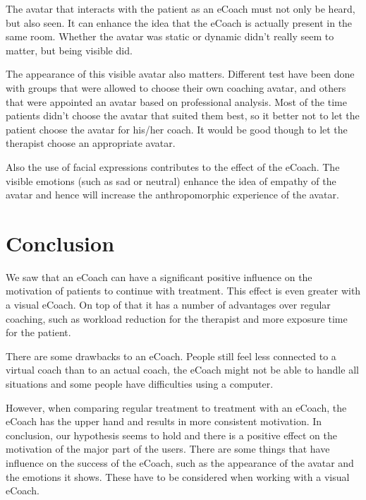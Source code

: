 \documentclass[twoside]{article}
\begin{document}
\begin{multicols}{2}
The avatar that interacts with the patient as an eCoach must not only be heard, but also seen. It can enhance the idea that the eCoach is actually present in the same room. Whether the avatar was static or dynamic didn't really seem to matter, but being visible did.\cite{baylor2009promoting}

The appearance of this visible avatar also matters. Different test have been done with groups that were allowed to choose their own coaching avatar, and others that were appointed an avatar based on professional analysis. Most of the time patients didn't choose the avatar that suited them best, so it better not to let the patient choose the avatar for his/her coach. It would be good though to let the therapist choose an appropriate avatar.\cite{baylor2009promoting}

Also the use of facial expressions contributes to the effect of the eCoach. The visible emotions (such as sad or neutral) enhance the idea of empathy of the avatar \cite{blanson2009online} and hence will increase the anthropomorphic experience of the avatar.


\section{Conclusion}
We saw that an eCoach can have a significant positive influence on the motivation of patients to continue with treatment. This effect is even greater with a visual eCoach. On top of that it has a number of advantages over regular coaching, such as workload reduction for the therapist and more exposure time for the patient.

There are some drawbacks to an eCoach. People still feel less connected to a virtual coach than to an actual coach, the eCoach might not be able to handle all situations and some people have difficulties using a computer.

However, when comparing regular treatment to treatment with an eCoach, the eCoach has the upper hand and results in more consistent motivation. In conclusion, our hypothesis seems to hold and there is a positive effect on the motivation of the major part of the users. There are some things that have influence on the success of the eCoach, such as the appearance of the avatar and the emotions it shows. These have to be considered when working with a visual eCoach.



\end{multicols}
\end{document}
